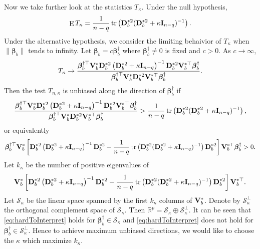 \documentclass[11pt]{article}
\DeclareMathOperator{\mytr}{tr}
\DeclareMathOperator{\myE}{E}
\newcommand{\bfsym}[1]{\ensuremath{\boldsymbol{#1}}}
\def\bbeta{\bfsym \beta}
\theoremstyle{plain}
\theoremstyle{definition}
\theoremstyle{remark}
\begin{document}
Now we take further look at the statistics $T_{\kappa}$.
Under the null hypothesis, 
\begin{equation*}
    \myE T_{\kappa}=
    \frac{1}{n-q} \mytr \left( \BD_b^{*2} ( \BD_b^{*2} + \kappa \BI_{n-q})^{-1}\right).
\end{equation*}
Under the alternative hypothesis, we consider the limiting behaivior of $T_{\kappa}$ when $\|\bbeta_b\|$ tends to infinity.
Let $\bbeta_b=c \bbeta_b^\dagger$ where $\bbeta_b^\dagger\neq 0$ is fixed and $c>0$.
As $c \to \infty$, 
\begin{equation*}
    T_{\kappa} \to
\frac{
    \bbeta_b^{\dagger \top} \BV_b^* \BD_b^{*2} \left( \BD_b^{*2} + \kappa \BI_{n-q} \right)^{-1} \BD_b^{*2} \BV_b^{*\top} \bbeta_b^{\dagger}
}{
    \bbeta_b^{\dagger \top} \BV_b^* \BD_b^{*2} \BV_b^{*\top} \bbeta_b^{\dagger}
}
.
\end{equation*}
Then the test $T_{n,\kappa}$ is unbiased along the direction of $\bbeta_b^\dagger$ if
\begin{equation*}
\frac{
    \bbeta_b^{\dagger \top} \BV_b^* \BD_b^{*2} \left( \BD_b^{*2} + \kappa \BI_{n-q} \right)^{-1} \BD_b^{*2} \BV_b^{*\top} \bbeta_b^{\dagger}
}{
    \bbeta_b^{\dagger \top} \BV_b^* \BD_b^{*2} \BV_b^{*\top} \bbeta_b^{\dagger}
}
>
\frac{1}{n-q} \mytr \left( \BD_b^{*2} ( \BD_b^{*2} + \kappa \BI_{n-q})^{-1}\right),
\end{equation*}
or equivalently
\begin{equation}\label{eq:hardToInterpret}
    \bbeta_b^{\dagger \top} \BV_b^*
\left[
    \BD_b^{*2} \left( \BD_b^{*2} + \kappa \BI_{n-q} \right)^{-1} \BD_b^{*2} 
-\frac{1}{n-q} \mytr \left( \BD_b^{*2} ( \BD_b^{*2} + \kappa \BI_{n-q})^{-1}\right)
     \BD_b^{*2} 
\right]
    \BV_b^{*\top} \bbeta_b^{\dagger}
    >0.
\end{equation}
Let $k_{\kappa}$ be the number of positive eigenvalues of
\begin{equation*}
    \BV_b^*
\left[
    \BD_b^{*2} \left( \BD_b^{*2} + \kappa \BI_{n-q} \right)^{-1} \BD_b^{*2} 
-\frac{1}{n-q} \mytr \left( \BD_b^{*2} ( \BD_b^{*2} + \kappa \BI_{n-q})^{-1}\right)
     \BD_b^{*2} 
\right]
\BV_b^{*\top}.
\end{equation*}
Let $\mathcal S_{\kappa}$ be the linear space spanned by the first $k_{\kappa}$ columns of $\mathbf{V}_{b}^*$.
Denote by $\mathcal S_{\kappa}^{\bot}$ the orthogonal complement space of $\mathcal S_\kappa$.
Then $\mathbb R^p=\mathcal S_\kappa \oplus \mathcal  S_{\kappa}^{\bot}$.
It can be seen that \eqref{eq:hardToInterpret} holds for $\bbeta_b^\dagger \in \mathcal S_\kappa$ and \eqref{eq:hardToInterpret} does not hold for $\bbeta_b^\dagger \in \mathcal S_{\kappa}^\bot$.
Hence to achieve maximum unbiased directions, we would like to choose the $\kappa$ which  maximize $k_{\kappa}$.
\end{document}
